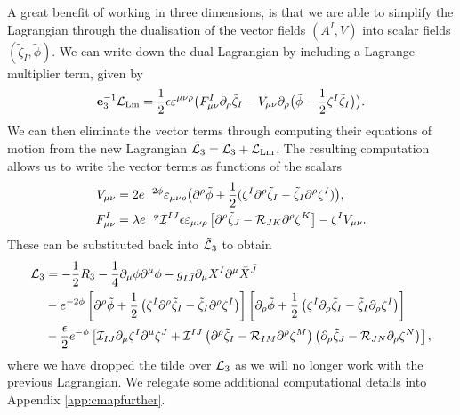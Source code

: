 A great benefit of working in three dimensions, is that we are able to simplify the Lagrangian through the dualisation of the vector fields $(A^I, V)$ into scalar fields $(\tilde{\zeta}_I, \tilde{\phi})$. We can write down the dual Lagrangian by including a Lagrange multiplier term, given by
\begin{equation}
\mathbf{e}_3^{-1} {\cal L}_{\text{Lm}} = \frac{1}{2} \epsilon \varepsilon^{\mu\nu\rho} \big(F^I_{\mu\nu}\partial_\rho\tilde{\zeta}_I - V_{\mu\nu}
\partial_\rho \big(\tilde{\phi} - \frac{1}{2} \zeta^I\tilde{\zeta}_I \big)\big).
\end{equation}
We can then eliminate the vector terms through computing their equations of motion from the new Lagrangian $\tilde{{\cal L}}_3 = {\cal L}_3 + {\cal L}_{\text{Lm}}$. The resulting computation allows us to write the vector terms as functions of the scalars
\begin{equation}
\begin{aligned}
 V_{\mu\nu} &= 2e^{-2\phi}\varepsilon_{\mu\nu\rho} \big( \partial^\rho \tilde{\phi} + \frac{1}{2}(\zeta^I \partial^\rho \tilde{\zeta}_I - \tilde{\zeta}_I \partial^\rho \zeta^I) \big),\\
 F_{\mu \nu}^I &= \lambda e^{-\phi} {\cal I}^{IJ} \epsilon \varepsilon_{\mu\nu\rho} \left[\partial^\rho \tilde{\zeta}_J - {\cal R}_{JK} \partial^\rho \zeta^K \right] - \zeta^I V_{\mu \nu}.
\end{aligned}
\end{equation}
These can be substituted back into $\tilde{{\cal L}}_{3}$ to obtain
\begin{equation}
\label{eq:3dunscaled}
\begin{aligned}
 {\cal L}_3 &=- \frac{1}{2} R_3 - \frac{1}{4}\partial_\mu \phi \partial^\mu \phi - g_{I\bar{J}} \partial_\mu X^I \partial^\mu \bar{X}^{\bar{J}} \\
 &- e^{-2\phi} \left[ \partial^\rho \tilde{\phi} + \frac{1}{2} \left(\zeta^I \partial^\rho \tilde{\zeta}_I - \tilde{\zeta}_I \partial^\rho \zeta^I \right) \right] \left[ \partial_\rho \tilde{\phi} + \frac{1}{2} \left(\zeta^I \partial_\rho \tilde{\zeta}_I - \tilde{\zeta}_I \partial_\rho \zeta^I \right) \right] \\
 &- \frac{\epsilon}{2} e^{-\phi} \left[{\cal I}_{IJ} \partial_\mu\zeta^I \partial^\mu \zeta^J + {\cal I}^{IJ} 
	\left(\partial^\rho \tilde{\zeta}_I - {\cal R}_{IM} \partial^\rho \zeta^M \right) 
	\left(\partial_\rho \tilde{\zeta}_J - {\cal R}_{JN} \partial_\rho \zeta^N \right) \right],
\end{aligned}
\end{equation}
where we have dropped the tilde over ${\cal L}_3$ as we will no longer work with the previous Lagrangian. We relegate some additional computational details into Appendix \ref{app:cmapfurther}.


